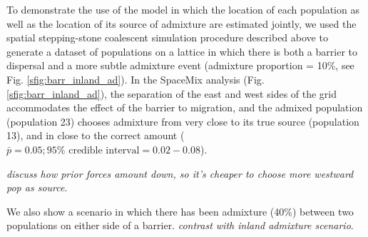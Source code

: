 \documentclass[12pt]{article}
\newcommand{\identifyadmixsource}[1]{{#1^{(*)}}}
\newcommand{\gb}[1]{{\em \color{magenta} #1}}
\begin{document}
{%


}

To demonstrate the use of the model in which the location of each population as well as the location of its source of admixture are estimated jointly, we used the spatial stepping-stone coalescent simulation procedure described above to generate a dataset of populations on a lattice in which there is both a barrier to dispersal and a more subtle admixture event (admixture proportion = 10\%, see Fig. \ref{sfig:barr_inland_ad}).  In the SpaceMix analysis (Fig. \ref{sfig:barr_inland_ad}), the separation of the east and west sides of the grid accommodates the effect of the barrier to migration, and the admixed population (population 23) chooses admixture from very close to its true source (population 13), and in close to the correct amount ($\bar{p} = 0.05; 95\% \text{ credible interval} = 0.02-0.08$). 

\gb{discuss how prior forces amount down, so it's cheaper to choose more westward pop as source}.

We also show a scenario in which there has been admixture (40\%) between two populations on either side of a barrier.  \gb{contrast with inland admixture scenario}.
\end{document}
